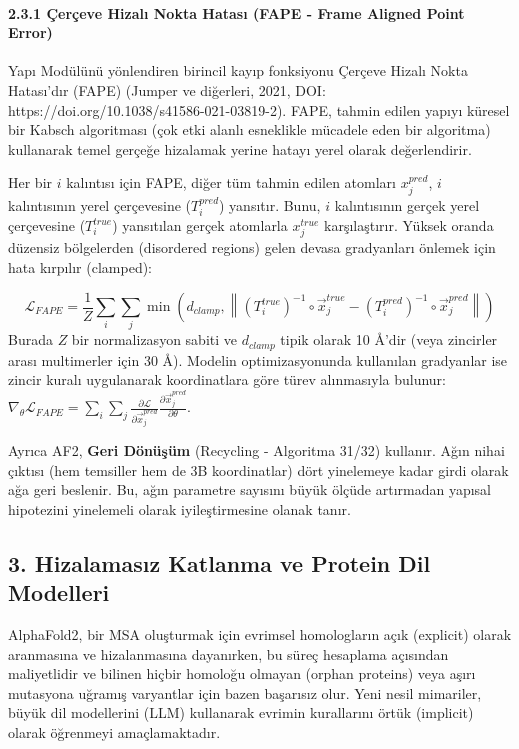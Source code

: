 \documentclass[11pt,a4paper]{article}
\begin{document}
\paragraph{2.3.1 Çerçeve Hizalı Nokta Hatası (FAPE - Frame Aligned Point Error)}
Yapı Modülünü yönlendiren birincil kayıp fonksiyonu Çerçeve Hizalı Nokta Hatası'dır (FAPE) (Jumper ve diğerleri, 2021, DOI: https://doi.org/10.1038/s41586-021-03819-2). FAPE, tahmin edilen yapıyı küresel bir Kabsch algoritması (çok etki alanlı esneklikle mücadele eden bir algoritma) kullanarak temel gerçeğe hizalamak yerine hatayı yerel olarak değerlendirir.

Her bir \(i\) kalıntısı için FAPE, diğer tüm tahmin edilen atomları \(x_j^{pred}\), \(i\) kalıntısının yerel çerçevesine (\(T_i^{pred}\)) yansıtır. Bunu, \(i\) kalıntısının gerçek yerel çerçevesine (\(T_i^{true}\)) yansıtılan gerçek atomlarla \(x_j^{true}\) karşılaştırır. Yüksek oranda düzensiz bölgelerden (disordered regions) gelen devasa gradyanları önlemek için hata kırpılır (clamped):

\[
\mathcal{L}_{FAPE} = \frac{1}{Z} \sum_{i} \sum_{j} \min \left( d_{clamp}, \left\| (T_i^{true})^{-1} \circ \vec{x}_j^{true} - (T_i^{pred})^{-1} \circ \vec{x}_j^{pred} \right\| \right)
\]
Burada \(Z\) bir normalizasyon sabiti ve \(d_{clamp}\) tipik olarak 10 Å'dir (veya zincirler arası multimerler için 30 Å). Modelin optimizasyonunda kullanılan gradyanlar ise zincir kuralı uygulanarak koordinatlara göre türev alınmasıyla bulunur: \(\nabla_{\theta}\mathcal{L}_{FAPE} = \sum_i \sum_j \frac{\partial \mathcal{L}}{\partial \vec{x}_j^{pred}} \frac{\partial \vec{x}_j^{pred}}{\partial \theta}\).

Ayrıca AF2, \textbf{Geri Dönüşüm} (Recycling - Algoritma 31/32) kullanır. Ağın nihai çıktısı (hem temsiller hem de 3B koordinatlar) dört yinelemeye kadar girdi olarak ağa geri beslenir. Bu, ağın parametre sayısını büyük ölçüde artırmadan yapısal hipotezini yinelemeli olarak iyileştirmesine olanak tanır.

\subsection{3. Hizalamasız Katlanma ve Protein Dil Modelleri}
AlphaFold2, bir MSA oluşturmak için evrimsel homologların açık (explicit) olarak aranmasına ve hizalanmasına dayanırken, bu süreç hesaplama açısından maliyetlidir ve bilinen hiçbir homoloğu olmayan (orphan proteins) veya aşırı mutasyona uğramış varyantlar için bazen başarısız olur. Yeni nesil mimariler, büyük dil modellerini (LLM) kullanarak evrimin kurallarını örtük (implicit) olarak öğrenmeyi amaçlamaktadır.
\end{document}
